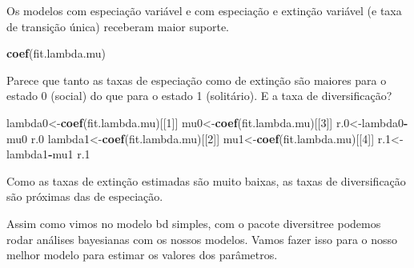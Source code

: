 \documentclass[
]{book}
\newenvironment{Shaded}{\begin{snugshade}}{\end{snugshade}}
\newcommand{\DecValTok}[1]{\textcolor[rgb]{0.00,0.00,0.81}{#1}}
\newcommand{\FloatTok}[1]{\textcolor[rgb]{0.00,0.00,0.81}{#1}}
\newcommand{\FunctionTok}[1]{\textcolor[rgb]{0.13,0.29,0.53}{\textbf{#1}}}
\newcommand{\NormalTok}[1]{#1}
\newcommand{\OtherTok}[1]{\textcolor[rgb]{0.56,0.35,0.01}{#1}}
\newcommand{\SpecialCharTok}[1]{\textcolor[rgb]{0.81,0.36,0.00}{\textbf{#1}}}
\begin{document}
Os modelos com especiação variável e com especiação e extinção variável (e taxa de transição única) receberam maior suporte.

\begin{Shaded}
\begin{Highlighting}[]
\FunctionTok{coef}\NormalTok{(fit.lambda.mu)}
\end{Highlighting}
\end{Shaded}

Parece que tanto as taxas de especiação como de extinção são maiores para o estado 0 (social) do que para o estado 1 (solitário).
E a taxa de diversificação?

\begin{Shaded}
\begin{Highlighting}[]
\NormalTok{lambda0}\OtherTok{\textless{}{-}}\FunctionTok{coef}\NormalTok{(fit.lambda.mu)[[}\DecValTok{1}\NormalTok{]]}
\NormalTok{mu0}\OtherTok{\textless{}{-}}\FunctionTok{coef}\NormalTok{(fit.lambda.mu)[[}\DecValTok{3}\NormalTok{]]}
\NormalTok{r}\FloatTok{.0}\OtherTok{\textless{}{-}}\NormalTok{lambda0}\SpecialCharTok{{-}}\NormalTok{mu0}
\NormalTok{r}\FloatTok{.0}
\NormalTok{lambda1}\OtherTok{\textless{}{-}}\FunctionTok{coef}\NormalTok{(fit.lambda.mu)[[}\DecValTok{2}\NormalTok{]]}
\NormalTok{mu1}\OtherTok{\textless{}{-}}\FunctionTok{coef}\NormalTok{(fit.lambda.mu)[[}\DecValTok{4}\NormalTok{]]}
\NormalTok{r}\FloatTok{.1}\OtherTok{\textless{}{-}}\NormalTok{lambda1}\SpecialCharTok{{-}}\NormalTok{mu1}
\NormalTok{r}\FloatTok{.1}
\end{Highlighting}
\end{Shaded}

Como as taxas de extinção estimadas são muito baixas, as taxas de diversificação
são próximas das de especiação.

Assim como vimos no modelo bd simples, com o pacote diversitree podemos rodar análises bayesianas com os nossos modelos. Vamos fazer isso para o nosso melhor modelo para estimar os valores dos parâmetros.
\end{document}
